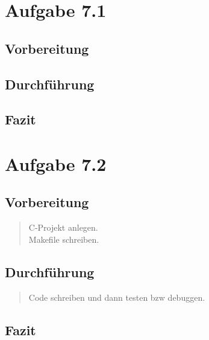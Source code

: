 \section{Aufgabe 7.1}
	\subsection{Vorbereitung}
		\begin{quote}
			
		\end{quote}
	\subsection{Durchführung}
		\begin{quote}
			
		\end{quote}
	\subsection{Fazit}
		\begin{quote}
			
		\end{quote}

\section{Aufgabe 7.2}
	\subsection{Vorbereitung}
		\begin{quote}
			C-Projekt anlegen.\\
			Makefile schreiben.\\
		\end{quote}
	\subsection{Durchführung}
		\begin{quote}
			Code schreiben und dann testen bzw debuggen.\\
		\end{quote}
	\subsection{Fazit}
		\begin{quote}
			
		\end{quote}